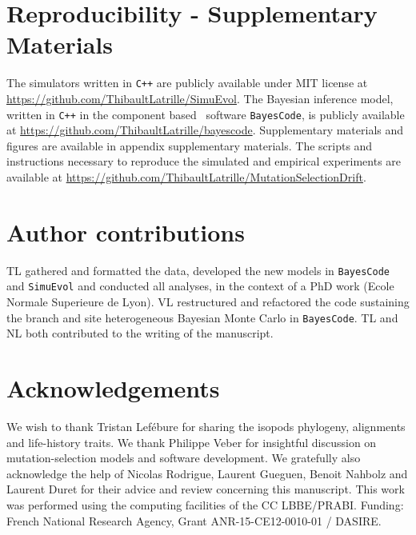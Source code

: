 \documentclass{article}
\begin{document}
\section{Reproducibility - Supplementary Materials}
The simulators written in \texttt{C++} are publicly available under MIT license at \url{https://github.com/ThibaultLatrille/SimuEvol}.
The Bayesian inference model, written in \texttt{C++} in the component based~\citep{Lanore2019} software \texttt{BayesCode}, is publicly available at \url{https://github.com/ThibaultLatrille/bayescode}.
Supplementary materials and figures are available in appendix supplementary materials.
The scripts and instructions necessary to reproduce the simulated and empirical experiments are available at \url{https://github.com/ThibaultLatrille/MutationSelectionDrift}.

\section{Author contributions}
TL gathered and formatted the data, developed the new models in \texttt{BayesCode} and \texttt{SimuEvol} and conducted all analyses, in the context of a PhD work (Ecole Normale Superieure de Lyon).
VL restructured and refactored the code sustaining the branch and site heterogeneous Bayesian Monte Carlo in \texttt{BayesCode}.
TL and NL both contributed to the writing of the manuscript.

\section{Acknowledgements}
We wish to thank Tristan Lefébure for sharing the isopods phylogeny, alignments and life-history traits.
We thank Philippe Veber for insightful discussion on mutation-selection models and software development.
We gratefully also acknowledge the help of Nicolas Rodrigue, Laurent Gueguen, Benoit Nahbolz and Laurent Duret for their advice and review concerning this manuscript.
This work was performed using the computing facilities of the CC LBBE/PRABI.
Funding: French National Research Agency, Grant ANR-15-CE12-0010-01 / DASIRE.


    
\end{document}

